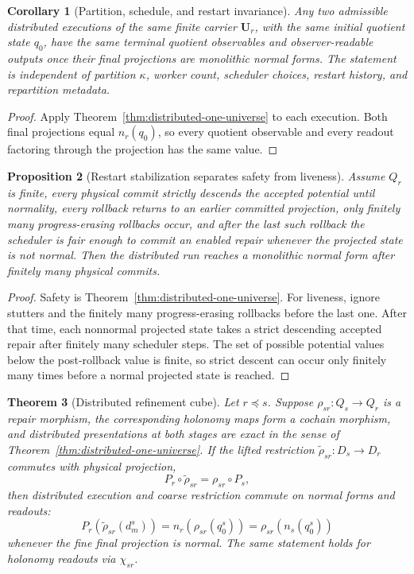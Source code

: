 \documentclass[11pt]{article}
\newtheorem{theorem}{Theorem}[section]
\newtheorem{corollary}[theorem]{Corollary}
\newtheorem{proposition}[theorem]{Proposition}
\theoremstyle{remark}
\theoremstyle{plain}
\begin{document}
\begin{corollary}[Partition, schedule, and restart invariance]\label{cor:distributed-invariance}
Any two admissible distributed executions of the same finite carrier \(\mathbf U_r\), with the
same initial quotient state \(q_0\), have the same terminal quotient observables and
observer-readable outputs once their final projections are monolithic normal forms. The statement
is independent of partition \(\kappa\), worker count, scheduler choices, restart history, and
repartition metadata.
\end{corollary}

\begin{proof}
Apply Theorem~\ref{thm:distributed-one-universe} to each execution. Both final projections equal
\(n_r(q_0)\), so every quotient observable and every readout factoring through the projection has
the same value.
\end{proof}

\begin{proposition}[Restart stabilization separates safety from liveness]\label{prop:restart-stabilization}
Assume \(Q_r\) is finite, every physical commit strictly descends the accepted potential until
normality, every rollback returns to an earlier committed projection, only finitely many
progress-erasing rollbacks occur, and after the last such rollback the scheduler is fair enough
to commit an enabled repair whenever the projected state is not normal. Then the distributed run
reaches a monolithic normal form after finitely many physical commits.
\end{proposition}

\begin{proof}
Safety is Theorem~\ref{thm:distributed-one-universe}. For liveness, ignore stutters and the
finitely many progress-erasing rollbacks before the last one. After that time, each nonnormal
projected state takes a strict descending accepted repair after finitely many scheduler steps. The set of possible
potential values below the post-rollback value is finite, so strict descent can occur only
finitely many times before a normal projected state is reached.
\end{proof}

\begin{theorem}[Distributed refinement cube]\label{thm:distributed-refinement-cube}
Let \(r\preceq s\). Suppose \(\rho_{sr}:Q_s\to Q_r\) is a repair morphism, the corresponding
holonomy maps form a cochain morphism, and distributed presentations at both stages are exact in
the sense of Theorem~\ref{thm:distributed-one-universe}. If the lifted restriction
\(\widetilde\rho_{sr}:D_s\to D_r\) commutes with physical projection,
\[
P_r\circ\widetilde\rho_{sr}=\rho_{sr}\circ P_s,
\]
then distributed execution and coarse restriction commute on normal forms and readouts:
\[
P_r\!\left(\widetilde\rho_{sr}(d_m^s)\right)
=
n_r\!\left(\rho_{sr}(q_0^s)\right)
=
\rho_{sr}\!\left(n_s(q_0^s)\right)
\]
whenever the fine final projection is normal. The same statement holds for holonomy readouts via
\(\chi_{sr}\).
\end{theorem}
\end{document}
